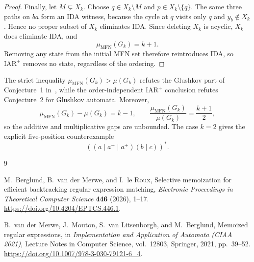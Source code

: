 \documentclass[11pt]{amsart}
\begin{document}
\begin{proof}
Finally, let $M\subsetneq X_k$.  Choose $q\in X_k\setminus M$ and
$p\in X_k\setminus\{q\}$.  The same three paths on $ba$ form an IDA
witness, because the cycle at $q$ visits only $q$ and
$y_b\notin X_k$.  Hence no proper subset of $X_k$ eliminates IDA.
Since deleting $X_k$ is acyclic, $X_k$ does eliminate IDA, and
\[
 \mu_{\mathrm{MFN}}(G_k)=k+1.
\]
Removing any state from the initial MFN set therefore reintroduces
IDA, so $\mathrm{IAR}^{+}$ removes no state, regardless of the ordering.
\end{proof}

The strict inequality
$\mu_{\mathrm{MFN}}(G_k)>\mu(G_k)$ refutes the Glushkov part of
Conjecture~1 in~\cite{Berglund2026}, while the order-independent
$\mathrm{IAR}^{+}$ conclusion refutes Conjecture~2 for Glushkov
automata.  Moreover,
\[
 \mu_{\mathrm{MFN}}(G_k)-\mu(G_k)=k-1,
 \qquad
 \frac{\mu_{\mathrm{MFN}}(G_k)}{\mu(G_k)}=\frac{k+1}{2},
\]
so the additive and multiplicative gaps are unbounded.  The case
$k=2$ gives the explicit five-position counterexample
\[
 \left((a\mid a^{+}\mid a^{+})(b\mid c)\right)^{*}.
\]

\begin{thebibliography}{9}

M.~Berglund, B.~van der Merwe, and I.~le Roux,
\newblock Selective memoization for efficient backtracking regular expression matching,
\newblock \emph{Electronic Proceedings in Theoretical Computer Science}
\textbf{446} (2026), 1--17.
\newblock \url{https://doi.org/10.4204/EPTCS.446.1}.

B.~van der Merwe, J.~Mouton, S.~van Litsenborgh, and M.~Berglund,
\newblock Memoized regular expressions,
\newblock in \emph{Implementation and Application of Automata (CIAA 2021)},
Lecture Notes in Computer Science, vol.~12803, Springer, 2021,
pp.~39--52.
\newblock \url{https://doi.org/10.1007/978-3-030-79121-6_4}.

\end{thebibliography}
\end{document}
